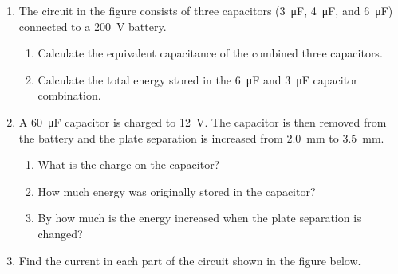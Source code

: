 \documentclass[11pt]{article}
\begin{document}
\begin{enumerate}[leftmargin=15pt]

\item The circuit in the figure consists of three capacitors
  (\SI{3}{\micro\farad}, \SI{4}{\micro\farad}, and \SI{6}{\micro\farad})
  connected to a \SI{200}{\volt} battery.
  
  \begin{minipage}{0.3\textwidth}
  \end{minipage}
  \begin{minipage}{.68\textwidth}
    \begin{enumerate}[noitemsep]
    \item Calculate the equivalent capacitance of the combined three
      capacitors.
    \item Calculate the total energy stored in the \SI{6}{\micro\farad} and
      \SI{3}{\micro\farad} capacitor combination.
    \end{enumerate}
  \end{minipage}
  \vspace{1.5in}
  
\item A \SI{60}{\micro\farad} capacitor is charged to \SI{12}{\volt}. The
  capacitor is then removed from the battery and the plate separation is
  increased from \SI{2.0}{mm} to \SI{3.5}{mm}.
  \begin{enumerate}[noitemsep]
  \item What is the charge on the capacitor?
  \item How much energy was originally stored in the capacitor?
  \item By how much is the energy increased when the plate separation is
    changed?
  \end{enumerate}
  \newpage

\item Find the current in each part of the circuit shown in the figure below.
  \begin{center}
  \end{center}
  \newpage
  

\end{enumerate}
\end{document}
